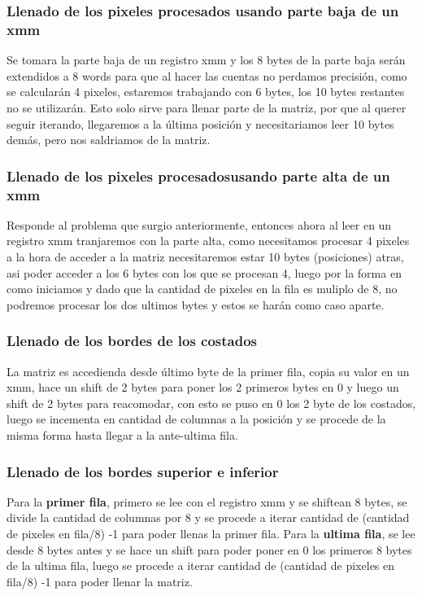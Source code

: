 \subsubsection{Llenado de los pixeles procesados usando parte baja de un xmm} Se tomara la parte baja de un registro xmm y los 8 bytes de la parte baja serán extendidos a 8 words para que al hacer las cuentas no perdamos precisión, como se calcularán 4 pixeles, estaremos trabajando con 6 bytes, los 10 bytes restantes no se utilizarán. Esto solo sirve para llenar parte de la matriz, por que al querer seguir iterando, llegaremos a la última posición y necesitariamos leer 10 bytes demás, pero nos saldriamos de la matriz.

\subsubsection{Llenado de los pixeles procesadosusando parte alta de un xmm} Responde al problema que surgio anteriormente, entonces ahora al leer en un registro xmm tranjaremos con la parte alta, como necesitamos procesar 4 pixeles a la hora de acceder a la matriz necesitaremos estar 10 bytes (posiciones) atras, asi poder acceder a los 6 bytes con los que se procesan 4, luego por la forma en como iniciamos y dado que la cantidad de pixeles en la fila es muliplo de 8, no podremos  procesar los dos ultimos bytes y estos se harán como caso aparte.




\subsubsection{Llenado de los bordes de los costados} La matriz es accedienda desde último byte de la primer fila, copia su valor en un xmm, hace un shift de 2 bytes para poner los 2 primeros bytes en 0 y luego un shift de 2 bytes para reacomodar, con esto se puso en 0 los 2 byte de los costados, luego se incementa en cantidad de columnas a la posición y se procede de la misma forma hasta llegar a la ante-ultima fila.

\subsubsection{Llenado de los bordes superior e inferior}
	Para la \textbf{primer fila}, primero se lee con el registro xmm y se shiftean 8 bytes, se divide la cantidad de columnas por 8 y se procede a iterar cantidad de (cantidad de pixeles en fila/8) -1 para poder llenas la primer fila.
	Para la \textbf{ultima fila}, se lee desde 8 bytes antes y se hace un shift para poder poner en 0 los primeros 8 bytes de la ultima fila, luego se procede a iterar cantidad de (cantidad de pixeles en fila/8) -1 para poder llenar la matriz.

